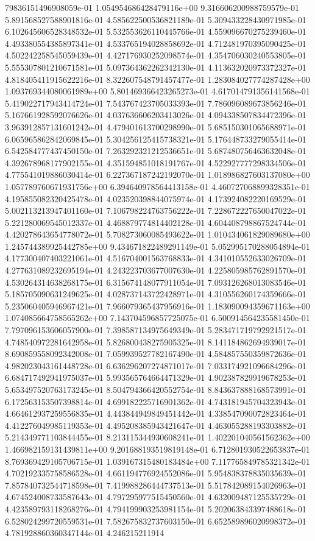 79836151496908059e-01	1.054954686428479116e+00	9.316606200988759579e-01	5.891568527588901816e-01	4.585622500536821189e-01	5.309433228430971985e-01	6.102645606528348532e-01	5.532553626110445766e-01	4.559096670275239460e-01	4.493380554385897341e-01	4.533765194028858692e-01	4.712481970395090425e-01	4.502242258545059439e-01	4.427176930252098574e-01	4.354706030240553805e-01	5.555307801210671581e-01	5.097364362262342130e-01	4.113632020973372327e-01	4.818405411915622216e-01	8.322607548791457477e-01	1.283084027774287428e+00	1.093769344080061989e+00	5.801469366423265273e-01	4.617014791356141568e-01	5.419022717943414724e-01	7.543767423705033393e-01	7.786096089673856246e-01	5.167661928592076626e-01	4.037636606203413026e-01	4.094338507834472396e-01	3.963912857131601242e-01	4.479401613700298990e-01	5.685150301065688971e-01	6.065965862842069845e-01	5.304256125415738321e-01	5.176448733279055414e-01	6.542584777437450150e-01	7.263292321212536651e-01	5.687480756463632048e-01	4.392678968177902155e-01	4.351594851018191767e-01	4.522927777298334506e-01	4.775541019886030414e-01	6.227367187242192070e-01	1.018986827603137080e+00	1.057789760671931756e+00	6.394640978564413158e-01	4.460727068899328351e-01	4.195855082320425478e-01	4.023520398844075974e-01	4.173924082220169529e-01	5.002113213947401160e-01	7.106798224763756222e-01	7.228672227650047022e-01	5.221280069545012337e-01	4.468879774814402128e-01	4.604408798867524744e-01	4.420278643654778072e-01	5.708273060085493622e-01	1.010434061829089680e+00	1.245744389925442785e+00	9.434671822489291149e-01	5.052995170288054894e-01	4.177300407403221061e-01	4.516704001563768833e-01	4.341010552633026709e-01	4.277631089232695194e-01	4.243223703677007630e-01	4.225805985762891570e-01	4.530264314638268175e-01	6.315674148077911054e-01	7.093126268013083546e-01	5.185705090631249625e-01	4.028737143722428971e-01	4.310556260174359666e-01	5.235060405946967421e-01	7.966079365437956916e-01	1.183090094359671163e+00	1.074085664758565262e+00	7.143704596857725075e-01	6.500914564235581450e-01	7.797096153606057900e-01	7.398587134975649349e-01	5.283471719792921517e-01	4.748540972281642958e-01	5.826800438275905325e-01	8.141184862694939017e-01	8.690859558092342008e-01	7.059939527782167490e-01	4.584857550359872636e-01	4.982023043161448728e-01	6.636296207274871017e-01	7.033174921096684296e-01	6.684717492941975037e-01	5.993565764664471329e-01	4.902387829919678253e-01	5.653497520763173245e-01	8.504794366420552754e-01	8.843637888168573991e-01	6.172563153507398814e-01	4.699182225716901362e-01	4.743181945704323943e-01	4.664612937259556835e-01	4.443844949849451442e-01	4.338547090072823464e-01	4.412276049985119353e-01	4.495208385943421647e-01	4.463055288193303882e-01	5.214349771103844455e-01	8.213115344930608241e-01	1.402201040561562362e+00	1.466982159131439811e+00	9.201688193519819148e-01	6.712801930522653837e-01	8.769369429105706715e-01	1.039167315480183484e+00	7.117765849785321342e-01	4.702192335758586528e-01	4.661194776924552086e-01	5.954838378835035639e-01	7.857840732544718598e-01	7.419988286444737513e-01	5.517842089154026963e-01	4.674524008733587643e-01	4.797295977515450560e-01	4.632009487125535729e-01	4.423589793118268276e-01	4.794199903253981154e-01	5.202063843397488618e-01	6.528024299720559531e-01	7.582675832737603150e-01	6.652589896020998372e-01	4.781928860360347144e-01	4.246215211914